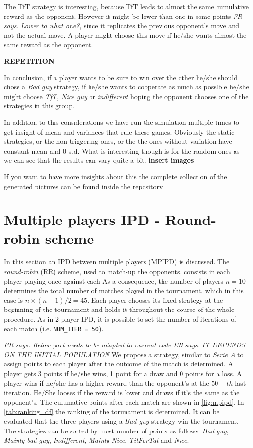 \documentclass[journal,a4paper,10pt,twoside,draft=false]{IEEEtran}
\newcommand{\EB}[1]{\textit{\color{blue}EB says: #1}}
\newcommand{\FR}[1]{\textit{\color{ForestGreen}FR says: #1}}
\begin{document}
The TfT strategy is interesting, because TfT leads to almost the same cumulative reward as the opponent.
However it might be lower than one in some points \FR{Lower to \emph{what} one?}, since it replicates the previous opponent's move and not the actual move.
A player might choose this move if he/she wants almost the same reward as the opponent.

\textbf{REPETITION}

In conclusion, if a player wants to be sure to win over the other he/she should chose a \textit{Bad guy} strategy, if he/she wants to cooperate as much as possible he/she might choose \textit{TfT, Nice guy} or \textit{indifferent} hoping the opponent chooses one of the strategies in this group.     

In addition to this considerations we have run the simulation multiple times to get insight of mean and variances that rule these games. Obviously the static strategies, or the non-triggering ones, or the the ones without variation have constant mean and $0$ std. What is interesting though is for the random ones as we can see that the results can vary quite a bit.
\textbf{insert images}

If you want to have more insights about this the complete collection of the generated pictures can be found inside the repository.
\section{Multiple players IPD - Round-robin scheme} \label{s:IPDMP}

In this section an IPD between multiple players (MPIPD) is discussed.
The \textit{round-robin} (RR) scheme, used to match-up the opponents, consists in each player playing once against each As a consequence, the number of players $n = 10$ determines the total number of matches played in the tournament, which in this case is ${n \times (n-1)}/{2} = 45$.
Each player chooses its fixed strategy at the beginning of the tournament and holds it throughout the course of the whole procedure.
As in 2-player IPD, it is possible to set the number of iterations of each match (i.e. \texttt{NUM\_ITER = 50}).

\FR{Below part needs to be adapted to current code}
\EB{IT DEPENDS ON THE INITIAL POPULATION}
We propose a strategy, similar to \textit{Serie A} to assign points to each player after the outcome of the match is determined. A player gets 3 points if he/she wins, 1 point for a draw and 0 points for a loss. A player wins if he/she has a higher reward than the opponent's at the $50-th$ last iteration. He/She looses if the reward is lower and draws if it's the same as the opponent's.
The culumative points after each match are shown in \autoref{fig:mpipd}.
In \autoref{tab:ranking_df} the ranking of the torunament is determined. It can be evaluated that the three players using a \textit{Bad guy} strategy win the tournament.
The strategies can be sorted by most number of points as follows: \textit{Bad guy}, \textit{Mainly bad guy}, \textit{Indifferent}, \textit{Mainly Nice}, \textit{TitForTat} and \textit{Nice}.
\end{document}
